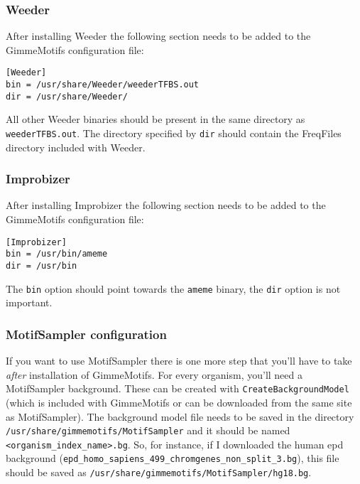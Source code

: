 \documentclass[11pt]{article}
\begin{document}
\subsubsection*{Weeder}
After installing Weeder the following section needs to be added to the GimmeMotifs configuration file:
\begin{verbatim}
[Weeder]
bin = /usr/share/Weeder/weederTFBS.out
dir = /usr/share/Weeder/ 
\end{verbatim}
All other Weeder binaries should be present in the same directory as \texttt{weederTFBS.out}. The directory specified by \texttt{dir} should contain the FreqFiles directory included with Weeder.

\subsubsection*{Improbizer}
After installing Improbizer the following section needs to be added to the GimmeMotifs configuration file:
\begin{verbatim}
[Improbizer]
bin = /usr/bin/ameme
dir = /usr/bin
\end{verbatim}
The \texttt{bin} option should point towards the \texttt{ameme} binary, the \texttt{dir} option is not important.

\subsubsection{MotifSampler configuration}
\label{sec:MotifSampler}
If you want to use MotifSampler there is one more step that you'll have to take \emph{after} installation of GimmeMotifs. For every organism, you'll need a MotifSampler background. These can be created with \texttt{CreateBackgroundModel} (which is included with GimmeMotifs or can be downloaded from the same site as MotifSampler). The background model file needs to be saved in the directory \texttt{/usr/share/gimmemotifs/MotifSampler} and it should be named \texttt{<organism\_index\_name>.bg}. So, for instance, if I downloaded the human epd background (\texttt{epd\_homo\_sapiens\_499\_chromgenes\_non\_split\_3.bg}), this file should be saved as \texttt{/usr/share/gimmemotifs/MotifSampler/hg18.bg}.
\end{document}
